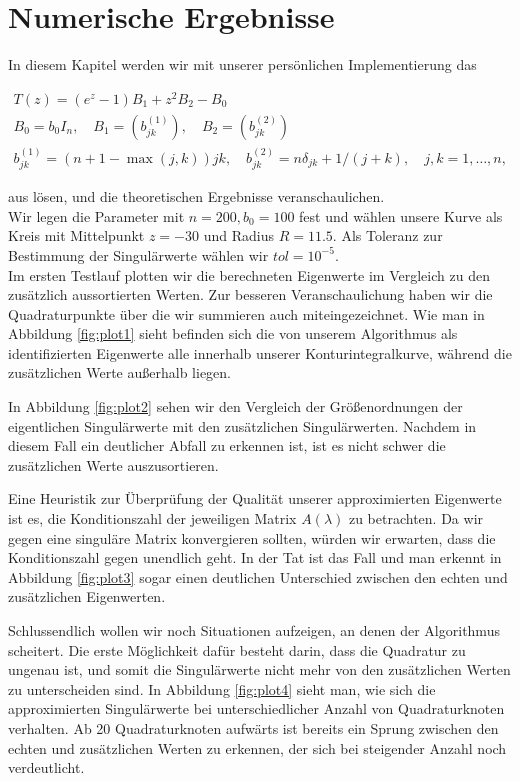 \chapter{Numerische Ergebnisse}

In diesem Kapitel werden wir mit unserer persönlichen Implementierung das 

\begin{gather*}
    T(z) = (e^z - 1) B_1 + z^2 B_2 - B_0 \\
    B_0 = b_0 I_n,
    \quad
    B_1 = (b_{j k}^{(1)}),
    \quad
    B_2 = (b_{j k}^{(2)}) \\
    b_{j k}^{(1)} = (n + 1 - \max(j, k)) j k,
    \quad
    b_{j k}^{(2)} = n \delta_{j k} + 1 / (j + k),
    \quad
    j, k = 1, \dots, n,
\end{gather*}

aus \cite{saad2020rational} lösen, und die theoretischen Ergebnisse veranschaulichen. \\
Wir legen die Parameter mit $n = 200, b_0 = 100$ fest und wählen
unsere Kurve als Kreis mit Mittelpunkt $z = -30$ und Radius $R = 11.5$.
Als Toleranz zur Bestimmung der  Singulärwerte wählen wir $tol = 10^{-5}$. \\
Im ersten Testlauf plotten wir die berechneten Eigenwerte im Vergleich zu
den zusätzlich aussortierten Werten. Zur besseren Veranschaulichung haben wir
die Quadraturpunkte über die wir summieren auch miteingezeichnet.
Wie man in Abbildung \ref{fig:plot1} sieht befinden sich die von unserem Algorithmus als 
identifizierten Eigenwerte alle innerhalb unserer Konturintegralkurve, während
die zusätzlichen Werte außerhalb liegen.

In Abbildung \ref{fig:plot2} sehen wir den Vergleich der Größenordnungen der
eigentlichen Singulärwerte mit den zusätzlichen Singulärwerten. Nachdem in diesem
Fall ein deutlicher Abfall zu erkennen ist, ist es nicht schwer die zusätzlichen
Werte auszusortieren.

Eine Heuristik zur Überprüfung der Qualität unserer approximierten Eigenwerte
ist es, die Konditionszahl der jeweiligen Matrix $A(\lambda)$ zu betrachten.
Da wir gegen eine singuläre Matrix konvergieren sollten, würden wir erwarten,
dass die Konditionszahl gegen unendlich geht. In der Tat ist das Fall und
man erkennt in Abbildung \ref{fig:plot3} sogar einen deutlichen Unterschied
zwischen den echten und zusätzlichen Eigenwerten.

Schlussendlich wollen wir noch Situationen aufzeigen, an denen der Algorithmus
scheitert. Die erste Möglichkeit dafür besteht darin, dass die Quadratur zu
ungenau ist, und somit die  Singulärwerte nicht mehr von den
zusätzlichen Werten zu unterscheiden sind. In Abbildung \ref{fig:plot4} sieht
man, wie sich die approximierten Singulärwerte bei unterschiedlicher Anzahl
von Quadraturknoten verhalten. Ab 20 Quadraturknoten aufwärts ist bereits
ein Sprung zwischen den echten und zusätzlichen Werten zu erkennen, der sich
bei steigender Anzahl noch verdeutlicht.


